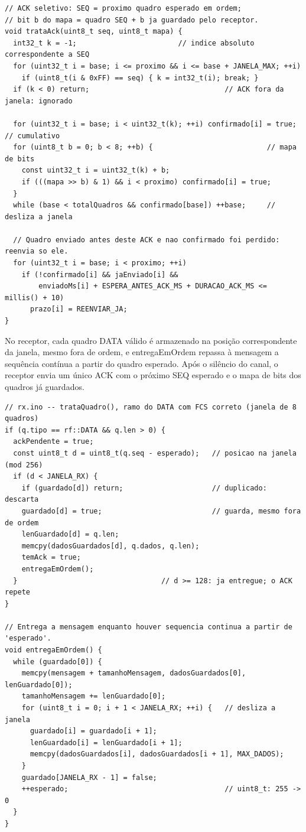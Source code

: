 \documentclass[12pt, oneside, a4paper, sumario=tradicional, chapter=TITLE, brazilian]{abntex2}
\begin{document}
\begin{apendicesenv}
\begin{Verbatim}[fontsize=\scriptsize,frame=single,framesep=2mm,rulecolor=\color{gray!60},breaklines,breakanywhere]
// ACK seletivo: SEQ = proximo quadro esperado em ordem;
// bit b do mapa = quadro SEQ + b ja guardado pelo receptor.
void trataAck(uint8_t seq, uint8_t mapa) {
  int32_t k = -1;                        // indice absoluto correspondente a SEQ
  for (uint32_t i = base; i <= proximo && i <= base + JANELA_MAX; ++i)
    if (uint8_t(i & 0xFF) == seq) { k = int32_t(i); break; }
  if (k < 0) return;                                // ACK fora da janela: ignorado

  for (uint32_t i = base; i < uint32_t(k); ++i) confirmado[i] = true;  // cumulativo
  for (uint8_t b = 0; b < 8; ++b) {                           // mapa de bits
    const uint32_t i = uint32_t(k) + b;
    if (((mapa >> b) & 1) && i < proximo) confirmado[i] = true;
  }
  while (base < totalQuadros && confirmado[base]) ++base;     // desliza a janela

  // Quadro enviado antes deste ACK e nao confirmado foi perdido: reenvia so ele.
  for (uint32_t i = base; i < proximo; ++i)
    if (!confirmado[i] && jaEnviado[i] &&
        enviadoMs[i] + ESPERA_ANTES_ACK_MS + DURACAO_ACK_MS <= millis() + 10)
      prazo[i] = REENVIAR_JA;
}
\end{Verbatim}

No receptor, cada quadro DATA válido é armazenado na posição correspondente da janela, mesmo fora de ordem, e entregaEmOrdem repassa à mensagem a sequência contínua a partir do quadro esperado. Após o silêncio do canal, o receptor envia um único ACK com o próximo SEQ esperado e o mapa de bits dos quadros já guardados.

\begin{Verbatim}[fontsize=\scriptsize,frame=single,framesep=2mm,rulecolor=\color{gray!60},breaklines,breakanywhere]
// rx.ino -- trataQuadro(), ramo do DATA com FCS correto (janela de 8 quadros)
if (q.tipo == rf::DATA && q.len > 0) {
  ackPendente = true;
  const uint8_t d = uint8_t(q.seq - esperado);   // posicao na janela (mod 256)
  if (d < JANELA_RX) {
    if (guardado[d]) return;                     // duplicado: descarta
    guardado[d] = true;                          // guarda, mesmo fora de ordem
    lenGuardado[d] = q.len;
    memcpy(dadosGuardados[d], q.dados, q.len);
    temAck = true;
    entregaEmOrdem();
  }                                  // d >= 128: ja entregue; o ACK repete
}

// Entrega a mensagem enquanto houver sequencia continua a partir de 'esperado'.
void entregaEmOrdem() {
  while (guardado[0]) {
    memcpy(mensagem + tamanhoMensagem, dadosGuardados[0], lenGuardado[0]);
    tamanhoMensagem += lenGuardado[0];
    for (uint8_t i = 0; i + 1 < JANELA_RX; ++i) {   // desliza a janela
      guardado[i] = guardado[i + 1];
      lenGuardado[i] = lenGuardado[i + 1];
      memcpy(dadosGuardados[i], dadosGuardados[i + 1], MAX_DADOS);
    }
    guardado[JANELA_RX - 1] = false;
    ++esperado;                                     // uint8_t: 255 -> 0
  }
}


\end{Verbatim}
\end{apendicesenv}
\end{document}
